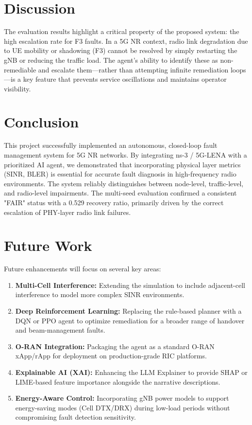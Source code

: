\documentclass[journal]{IEEEtran}
\begin{document}
\section{Discussion}
The evaluation results highlight a critical property of the proposed system: the high escalation rate for F3 faults. In a 5G NR context, radio link degradation due to UE mobility or shadowing (F3) cannot be resolved by simply restarting the gNB or reducing the traffic load. The agent's ability to identify these as non-remediable and escalate them—rather than attempting infinite remediation loops—is a key feature that prevents service oscillations and maintains operator visibility.

\section{Conclusion}
This project successfully implemented an autonomous, closed-loop fault management system for 5G NR networks. By integrating ns-3 / 5G-LENA with a prioritized AI agent, we demonstrated that incorporating physical layer metrics (SINR, BLER) is essential for accurate fault diagnosis in high-frequency radio environments. The system reliably distinguishes between node-level, traffic-level, and radio-level impairments. The multi-seed evaluation confirmed a consistent "FAIR" status with a 0.529 recovery ratio, primarily driven by the correct escalation of PHY-layer radio link failures.

\section{Future Work}
Future enhancements will focus on several key areas:
\begin{enumerate}
    \item \textbf{Multi-Cell Interference:} Extending the simulation to include adjacent-cell interference to model more complex SINR environments.
    \item \textbf{Deep Reinforcement Learning:} Replacing the rule-based planner with a DQN or PPO agent to optimize remediation for a broader range of handover and beam-management faults.
    \item \textbf{O-RAN Integration:} Packaging the agent as a standard O-RAN xApp/rApp for deployment on production-grade RIC platforms.
    \item \textbf{Explainable AI (XAI):} Enhancing the LLM Explainer to provide SHAP or LIME-based feature importance alongside the narrative descriptions.
    \item \textbf{Energy-Aware Control:} Incorporating gNB power models to support energy-saving modes (Cell DTX/DRX) during low-load periods without compromising fault detection sensitivity.
\end{enumerate}
\end{document}
